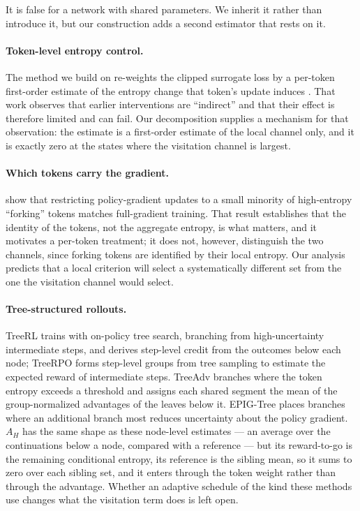 \documentclass[11pt]{article}
\newcommand{\AH}{A_{H}}
\begin{document}
\noindent
It is false for a network with shared parameters. We inherit it rather than
introduce it, but our construction adds a second estimator that rests on it.

\paragraph{Token-level entropy control.}
The method we build on re-weights the clipped surrogate loss by a per-token
first-order estimate of the entropy change that token's update induces
\citep{steer}. That work observes that earlier interventions are ``indirect'' and
that their effect is therefore limited and can fail. Our decomposition supplies a
mechanism for that observation: the estimate is a first-order estimate of the local
channel only, and it is exactly zero at the states where the visitation channel is
largest.

\paragraph{Which tokens carry the gradient.}
\citet{wang2025dbeyond} show that restricting policy-gradient updates to a small
minority of high-entropy ``forking'' tokens matches full-gradient training. That
result establishes that the identity of the tokens, not the aggregate entropy,
is what matters, and it motivates a per-token treatment; it does not, however,
distinguish the two channels, since forking tokens are identified by their local
entropy. Our analysis predicts that a local criterion will select a systematically
different set from the one the visitation channel would select.

\paragraph{Tree-structured rollouts.}
TreeRL \citep{hou2025treerl} trains with on-policy tree search, branching from
high-uncertainty intermediate steps, and derives step-level credit from the outcomes
below each node; TreeRPO \citep{yang2025treerpo} forms step-level groups from tree
sampling to estimate the expected reward of intermediate steps. TreeAdv
\citep{cao2026treeadv} branches where the token entropy exceeds a threshold and
assigns each shared segment the mean of the group-normalized advantages of the leaves
below it. EPIG-Tree \citep{khomich2026epig} places branches where an additional
branch most reduces uncertainty about the policy gradient. $\AH$ has the same shape
as these node-level estimates --- an average over the continuations below a node,
compared with a reference --- but its reward-to-go is the remaining conditional
entropy, its reference is the sibling mean, so it sums to zero over each sibling set,
and it enters through the token weight rather than through the advantage. Whether an
adaptive schedule of the kind these methods use changes what the visitation term does
is left open.
\end{document}
